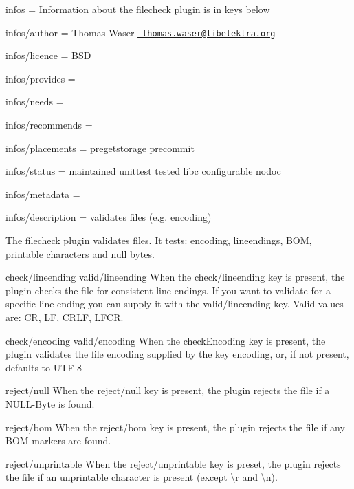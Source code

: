 
\begin{DoxyItemize}
\item infos = Information about the filecheck plugin is in keys below
\item infos/author = Thomas Waser \href{mailto:thomas.waser@libelektra.org}{\texttt{ thomas.\+waser@libelektra.\+org}}
\item infos/licence = B\+SD
\item infos/provides =
\item infos/needs =
\item infos/recommends =
\item infos/placements = pregetstorage precommit
\item infos/status = maintained unittest tested libc configurable nodoc
\item infos/metadata =
\item infos/description = validates files (e.\+g. encoding)
\end{DoxyItemize}

The filecheck plugin validates files. It tests\+: encoding, lineendings, B\+OM, printable characters and null bytes.

{\ttfamily check/lineending} {\ttfamily valid/lineending} When the {\ttfamily check/lineending} key is present, the plugin checks the file for consistent line endings. If you want to validate for a specific line ending you can supply it with the {\ttfamily valid/lineending} key. Valid values are\+: {\ttfamily CR}, {\ttfamily LF}, {\ttfamily C\+R\+LF}, {\ttfamily L\+F\+CR}.

{\ttfamily check/encoding} {\ttfamily valid/encoding} When the {\ttfamily check\+Encoding} key is present, the plugin validates the file encoding supplied by the key {\ttfamily encoding}, or, if not present, defaults to {\ttfamily U\+T\+F-\/8}

{\ttfamily reject/null} When the {\ttfamily reject/null} key is present, the plugin rejects the file if a N\+U\+L\+L-\/\+Byte is found.

{\ttfamily reject/bom} When the {\ttfamily reject/bom} key is present, the plugin rejects the file if any B\+OM markers are found.

{\ttfamily reject/unprintable} When the {\ttfamily reject/unprintable} key is preset, the plugin rejects the file if an unprintable character is present (except {\ttfamily \textbackslash{}r} and {\ttfamily \textbackslash{}n}). 